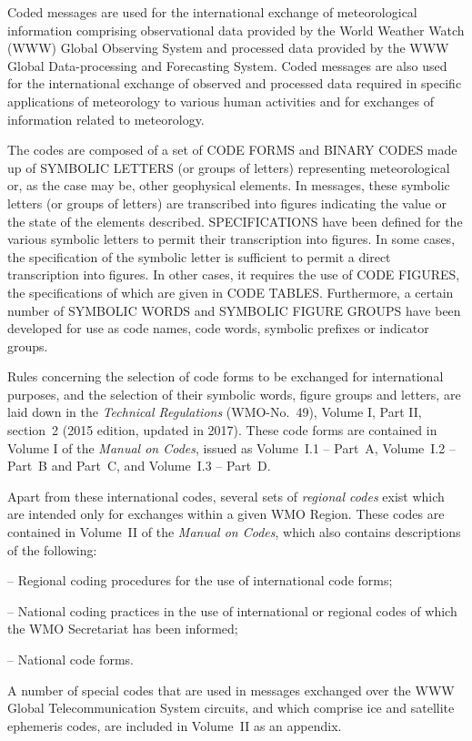 Coded messages are used for the international exchange of meteorological information comprising observational data provided by the World Weather Watch (WWW) Global Observing System and processed data provided by the WWW Global Data-processing and Forecasting System. Coded messages are also used for the international exchange of observed and processed data required in specific applications of meteorology to various human activities and for exchanges of information related to meteorology.

The codes are composed of a set of CODE FORMS and BINARY CODES made up of SYMBOLIC LETTERS (or groups of letters) representing meteorological or, as the case may be, other geophysical elements. In messages, these symbolic letters (or groups of letters) are transcribed into figures indicating the value or the state of the elements described. SPECIFICATIONS have been defined for the various symbolic letters to permit their transcription into figures. In some cases, the specification of the symbolic letter is sufficient to permit a direct transcription into figures. In other cases, it requires the use of CODE FIGURES, the specifications of which are given in CODE TABLES. Furthermore, a certain number of SYMBOLIC WORDS and SYMBOLIC FIGURE GROUPS have been developed for use as code names, code words, symbolic prefixes or indicator groups.

Rules concerning the selection of code forms to be exchanged for international purposes, and the selection of their symbolic words, figure groups and letters, are laid down in the \emph{Technical Regulations} (WMO-No.~49), Volume I, Part II, section~2 (2015 edition, updated in 2017). These code forms are contained in Volume I of the \emph{Manual on Codes}, issued as Volume~I.1 -- Part~A, Volume~I.2 -- Part~B and Part~C, and Volume~I.3 -- Part~D.

Apart from these international codes, several sets of \emph{regional codes} exist which are intended only for exchanges within a given WMO Region. These codes are contained in Volume~II of the \emph{Manual on Codes}, which also contains descriptions of the following:

-- Regional coding procedures for the use of international code forms;

-- National coding practices in the use of international or regional codes of which the WMO Secretariat has been informed;

-- National code forms.

A number of special codes that are used in messages exchanged over the WWW Global Telecommunication System circuits, and which comprise ice and satellite ephemeris codes, are included in Volume~II as an appendix.

